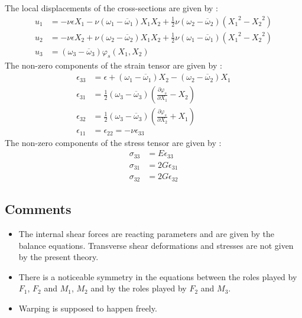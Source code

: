 The local displacements of the cross-sections are given by :
\begin{subequations}
	\begin{alignat}{1}
	u_1 &=
	-\nu \epsilon X_1 
	- \nu(\omega_1 - \overbar{\omega}_1) X_1 X_2
	+ \tfrac{1}{2}\nu(\omega_2 - \overbar{\omega}_2)({X_1}^2 - {X_2}^2)
	\\[0.5em]
	u_2 &= 
	-\nu \epsilon X_2 
	+ \nu(\omega_2 - \overbar{\omega}_2) X_1 X_2
	+ \tfrac{1}{2}\nu(\omega_1 - \overbar{\omega}_1)({X_1}^2 - {X_2}^2)
	\\[0.5em]
	u_3 &= (\omega_3 - \overbar{\omega}_3)\varphi_s(X_1,X_2)
	\end{alignat}
\end{subequations}
The non-zero components of the strain tensor are given by :
\begin{subequations}
	\begin{alignat}{1}
	\epsilon_{33} &= \epsilon + (\omega_1 - \overbar{\omega}_1) X_2 - (\omega_2 - \overbar{\omega}_2) X_1
	\\
	\epsilon_{31} &= \tfrac{1}{2}(\omega_3 - \overbar{\omega}_3)\left(\frac{\partial \varphi_s}{\partial {X_1}} - X_2 \right)
	\\
	\epsilon_{32} &= \tfrac{1}{2}(\omega_3 - \overbar{\omega}_3)\left(\frac{\partial \varphi_s}{\partial {X_2}} + X_1 \right)
	\\
	\epsilon_{11} &=  \epsilon_{22} = -\nu \epsilon_{33}
	\end{alignat}
\end{subequations}
The non-zero components of the stress tensor are given by :
\begin{subequations}
	\begin{alignat}{1}
	\sigma_{33} &= E \epsilon_{33} 
	\\
	\sigma_{31} &= 2G \epsilon_{31}
	\\
	\sigma_{32} &= 2G \epsilon_{32}
	\end{alignat}
\end{subequations}

\subsection{Comments}

\begin{itemize}
\item 
The internal shear forces are reacting parameters and are given by the balance equations. Transverse shear deformations and stresses are not given by the present theory.
\item
There is a noticeable symmetry in the equations between the roles played by $F_1$, $F_2$ and $M_1$, $M_2$ and by the roles played by $F_2$ and $M_3$.
\item
Warping is supposed to happen freely.
\end{itemize}



